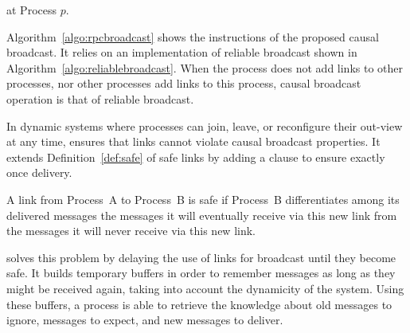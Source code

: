 \begin{algorithm}[h]
  
  \caption{\label{algo:rpcbroadcast}\RPCBROADCAST at Process $p$.}
\end{algorithm}


Algorithm~\ref{algo:rpcbroadcast} shows the instructions of the proposed causal
broadcast. It relies on an implementation of reliable broadcast shown in
Algorithm~\ref{algo:reliablebroadcast}. When the process does not add links to
other processes, nor other processes add links to this process, causal broadcast
operation is that of reliable broadcast. 

In dynamic systems where processes can join, leave, or reconfigure their
out-view at any time, \RPCBROADCAST ensures that links cannot violate causal
broadcast properties. It extends Definition~\ref{def:safe} of safe links by
adding a clause to ensure exactly once delivery.


\begin{definition}[\label{def:extension}Safe link extension]
  A link from Process~A to Process~B is safe if Process~B differentiates among
  its delivered messages the messages it will eventually receive via this new
  link from the messages it will never receive via this new link.
\end{definition}


\RPCBROADCAST solves this problem by delaying the use of links for broadcast
until they become safe. It builds temporary buffers in order to remember
messages as long as they might be received again, taking into account the
dynamicity of the system. Using these buffers, a process is able to retrieve the
knowledge about old messages to ignore, messages to expect, and new messages to
deliver.

